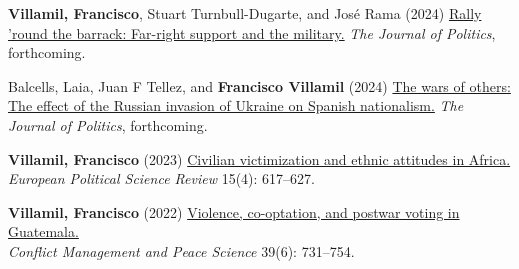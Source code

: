 \documentclass[a4paper, 12pt]{article}
\renewcommand\labelitemi{\textbf{--}}
\begin{document}
\begin{etaremune}[leftmargin=12pt, itemsep=0pt]
\item \textbf{Villamil, Francisco}, Stuart Turnbull-Dugarte, and José Rama (2024) \href{https://doi.org/10.1086/727598}{Rally 'round the barrack: Far-right support and the military.} \textit{The Journal of Politics}, forthcoming.
\item Balcells, Laia, Juan F Tellez, and \textbf{Francisco Villamil} (2024) \href{https://doi.org/10.1086/726939}{The wars of others: The effect of the Russian invasion of Ukraine on Spanish nationalism.} \textit{The Journal of Politics}, forthcoming.
\item \textbf{Villamil, Francisco} (2023) \href{https://doi.org/10.1017/S1755773923000097}{Civilian victimization and ethnic attitudes in Africa.}\\\textit{European Political Science Review} 15(4): 617--627.
\item \textbf{Villamil, Francisco} (2022) \href{https://journals.sagepub.com/doi/full/10.1177/07388942211066539}{Violence, co-optation, and postwar voting in Guatemala.}\\\textit{Conflict Management and Peace Science} 39(6): 731--754.

\end{etaremune}
\end{document}
